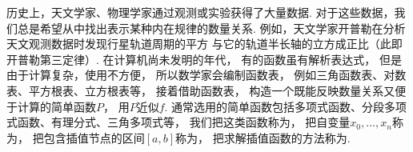 历史上，天文学家、物理学家通过观测或实验获得了大量数据.
对于这些数据，我们总是希望从中找出表示某种内在规律的数量关系.
例如，天文学家开普勒在分析天文观测数据时发现行星轨道周期的平方
与它的轨道半长轴的立方成正比（此即开普勒第三定律）.
在计算机尚未发明的年代，
有的函数虽有解析表达式，
但是由于计算复杂，使用不方便，
所以数学家会编制函数表，
例如三角函数表、对数表、平方根表、立方根表等，
接着借助函数表，
构造一个既能反映数量关系又便于计算的简单函数\(P\)，
用\(P\)近似\(f\).
通常选用的简单函数包括多项式函数、分段多项式函数、有理分式、三角多项式等，
我们把这类函数称为，
把自变量\(x_0,\dotsc,x_n\)称为，
把包含插值节点的区间\([a,b]\)称为，
把求解插值函数的方法称为.
